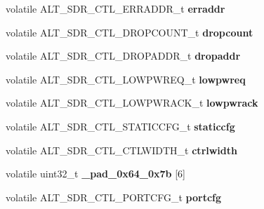 \begin{DoxyCompactItemize}
volatile A\+L\+T\+\_\+\+S\+D\+R\+\_\+\+C\+T\+L\+\_\+\+E\+R\+R\+A\+D\+D\+R\+\_\+t {\bfseries erraddr}
\item 
\mbox{\label{structALT__SDR__CTL__s_a66a381f7894dccd7b0538e2918e597f7}} 
volatile A\+L\+T\+\_\+\+S\+D\+R\+\_\+\+C\+T\+L\+\_\+\+D\+R\+O\+P\+C\+O\+U\+N\+T\+\_\+t {\bfseries dropcount}
\item 
\mbox{\label{structALT__SDR__CTL__s_ae89a560cdba70e75842e526adb2de0f6}} 
volatile A\+L\+T\+\_\+\+S\+D\+R\+\_\+\+C\+T\+L\+\_\+\+D\+R\+O\+P\+A\+D\+D\+R\+\_\+t {\bfseries dropaddr}
\item 
\mbox{\label{structALT__SDR__CTL__s_a1530af95a74e76e4e726394440c1bbce}} 
volatile A\+L\+T\+\_\+\+S\+D\+R\+\_\+\+C\+T\+L\+\_\+\+L\+O\+W\+P\+W\+R\+E\+Q\+\_\+t {\bfseries lowpwreq}
\item 
\mbox{\label{structALT__SDR__CTL__s_a30c559a8ed8f1400d5b34d79fbe08196}} 
volatile A\+L\+T\+\_\+\+S\+D\+R\+\_\+\+C\+T\+L\+\_\+\+L\+O\+W\+P\+W\+R\+A\+C\+K\+\_\+t {\bfseries lowpwrack}
\item 
\mbox{\label{structALT__SDR__CTL__s_a150306176e462e05b634c94be402cf62}} 
volatile A\+L\+T\+\_\+\+S\+D\+R\+\_\+\+C\+T\+L\+\_\+\+S\+T\+A\+T\+I\+C\+C\+F\+G\+\_\+t {\bfseries staticcfg}
\item 
\mbox{\label{structALT__SDR__CTL__s_a2e0e03ea7da0fa53a8ab99bee10852ad}} 
volatile A\+L\+T\+\_\+\+S\+D\+R\+\_\+\+C\+T\+L\+\_\+\+C\+T\+L\+W\+I\+D\+T\+H\+\_\+t {\bfseries ctrlwidth}
\item 
\mbox{\label{structALT__SDR__CTL__s_a6736d68a815b9fbf9517b3a8774f9a52}} 
volatile uint32\+\_\+t {\bfseries \+\_\+pad\+\_\+0x64\+\_\+0x7b} \mbox{[}6\mbox{]}
\item 
\mbox{\label{structALT__SDR__CTL__s_a7d4be7deaca4dcb0610876f127efe909}} 
volatile A\+L\+T\+\_\+\+S\+D\+R\+\_\+\+C\+T\+L\+\_\+\+P\+O\+R\+T\+C\+F\+G\+\_\+t {\bfseries portcfg}
\item 
\mbox{\label{structALT__SDR__CTL__s_ae4646b3dfbb06b3342b784a43e7f6f6f}} 

\end{DoxyCompactItemize}
